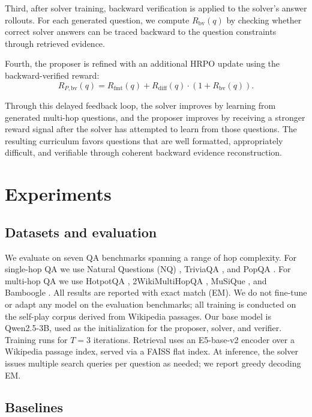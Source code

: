 \documentclass{article}
\begin{document}
Third, after solver training, backward verification is applied to the solver's answer rollouts. For each generated question, we compute $R_{\mathrm{bv}}(q)$ by checking whether correct solver answers can be traced backward to the question constraints through retrieved evidence.

Fourth, the proposer is refined with an additional HRPO update using the backward-verified reward:
\[
R_{P,\mathrm{bv}}(q)
=
R_{\mathrm{fmt}}(q)
+
R_{\mathrm{diff}}(q)
\cdot
\left(1+R_{\mathrm{bv}}(q)\right).
\]

Through this delayed feedback loop, the solver improves by learning from generated multi-hop questions, and the proposer improves by receiving a stronger reward signal after the solver has attempted to learn from those questions. The resulting curriculum favors questions that are well formatted, appropriately difficult, and verifiable through coherent backward evidence reconstruction.

\section{Experiments}

\subsection{Datasets and evaluation}

We evaluate on seven QA benchmarks spanning a range of hop complexity.
For single-hop QA we use Natural Questions (NQ) \cite{NQ}, TriviaQA \cite{TriviaQA}, and PopQA \cite{PopQA}.
For multi-hop QA we use HotpotQA \cite{HotpotQA}, 2WikiMultiHopQA \cite{MultiHopQA}, MuSiQue \cite{MuSiQue}, and Bamboogle \cite{CompositionalityGap}.
All results are reported with exact match (EM).
We do not fine-tune or adapt any model on the evaluation benchmarks; all training is conducted on the self-play corpus derived from Wikipedia passages.
Our base model is Qwen2.5-3B, used as the initialization for the proposer, solver, and verifier.
Training runs for $T = 3$ iterations. Retrieval uses an E5-base-v2 encoder over a Wikipedia passage index, served via a FAISS flat index.
At inference, the solver issues multiple search queries per question as needed; we report greedy decoding EM.

\subsection{Baselines}
\end{document}
